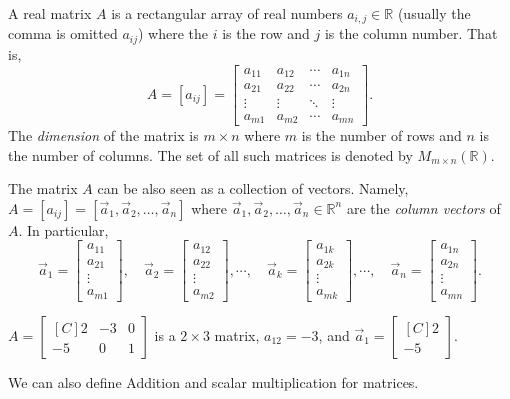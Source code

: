 \begin{definition}[Matrix]
A real matrix $A$ is a rectangular array of real numbers 
$a_{i,j} \in \mathbb{R}$ (usually the comma is omitted $a_{ij}$)  where the $i$ 
is the row and $j$ is the column number. That is, 
\[
A=[a_{ij}]=\begin{bmatrix}
a_{11} & a_{12} & \cdots & a_{1n} \\
a_{21} & a_{22} & \cdots & a_{2n} \\
\vdots & \vdots & \ddots & \vdots \\
a_{m1} & a_{m2} & \cdots & a_{mn} 
\end{bmatrix}.
\]
The \emph{dimension} of the matrix is $m\times n$ where $m$ is the number of 
rows and $n$ is the number of columns. The set of all such matrices is denoted 
by $M_{m\times n}(\mathbb{R})$.
\end{definition}
The matrix $A$ can be also seen as a collection of vectors. Namely, 
$A=[a_{ij}]=[\vec{a}_1, \vec{a}_2, \ldots, \vec{a}_n]$ where 
 $\vec{a}_1, \vec{a}_2,\ldots, \vec{a}_n \in \mathbb{R}^n$ are the \emph{column 
vectors} of $A$. In particular, 
\[
\vec{a}_1=\begin{bmatrix}a_{11}\\a_{21}\\ \vdots \\ a_{m1}\end{bmatrix}, \quad 
\vec{a}_2=\begin{bmatrix}a_{12}\\a_{22}\\ \vdots \\ a_{m2}\end{bmatrix}, 
\cdots, \quad 
\vec{a}_k=\begin{bmatrix}a_{1k}\\a_{2k}\\ \vdots \\ a_{mk}\end{bmatrix}, 
\cdots, \quad 
\vec{a}_n=\begin{bmatrix}a_{1n}\\a_{2n}\\ \vdots \\ a_{mn}\end{bmatrix}.
\]

\begin{example}
$A=\begin{bmatrix*}[C]
2 & -3 & 0 \\
-5 & 0 & 1 
\end{bmatrix*}$
is a $2 \times 3$ matrix, $a_{12}=-3$, and  
$\vec{a}_1=\begin{bmatrix*}[C] 2 \\ -5 \end{bmatrix*}$.
\end{example}
We can also define Addition and scalar multiplication for matrices.

